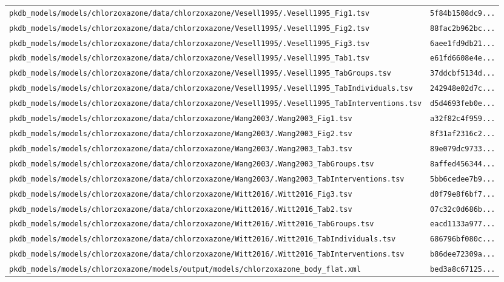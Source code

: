 \documentclass{article}
\begin{document}
\begin{longtable}{ll}
\texttt{pkdb\_models/models/chlorzoxazone/data/chlorzoxazone/Vesell1995/.Vesell1995\_Fig1.tsv} & \texttt{5f84b1508dc9...} \\
\texttt{pkdb\_models/models/chlorzoxazone/data/chlorzoxazone/Vesell1995/.Vesell1995\_Fig2.tsv} & \texttt{88fac2b962bc...} \\
\texttt{pkdb\_models/models/chlorzoxazone/data/chlorzoxazone/Vesell1995/.Vesell1995\_Fig3.tsv} & \texttt{6aee1fd9db21...} \\
\texttt{pkdb\_models/models/chlorzoxazone/data/chlorzoxazone/Vesell1995/.Vesell1995\_Tab1.tsv} & \texttt{e61fd6608e4e...} \\
\texttt{pkdb\_models/models/chlorzoxazone/data/chlorzoxazone/Vesell1995/.Vesell1995\_TabGroups.tsv} & \texttt{37ddcbf5134d...} \\
\texttt{pkdb\_models/models/chlorzoxazone/data/chlorzoxazone/Vesell1995/.Vesell1995\_TabIndividuals.tsv} & \texttt{242948e02d7c...} \\
\texttt{pkdb\_models/models/chlorzoxazone/data/chlorzoxazone/Vesell1995/.Vesell1995\_TabInterventions.tsv} & \texttt{d5d4693feb0e...} \\
\texttt{pkdb\_models/models/chlorzoxazone/data/chlorzoxazone/Wang2003/.Wang2003\_Fig1.tsv} & \texttt{a32f82c4f959...} \\
\texttt{pkdb\_models/models/chlorzoxazone/data/chlorzoxazone/Wang2003/.Wang2003\_Fig2.tsv} & \texttt{8f31af2316c2...} \\
\texttt{pkdb\_models/models/chlorzoxazone/data/chlorzoxazone/Wang2003/.Wang2003\_Tab3.tsv} & \texttt{89e079dc9733...} \\
\texttt{pkdb\_models/models/chlorzoxazone/data/chlorzoxazone/Wang2003/.Wang2003\_TabGroups.tsv} & \texttt{8affed456344...} \\
\texttt{pkdb\_models/models/chlorzoxazone/data/chlorzoxazone/Wang2003/.Wang2003\_TabInterventions.tsv} & \texttt{5bb6cedee7b9...} \\
\texttt{pkdb\_models/models/chlorzoxazone/data/chlorzoxazone/Witt2016/.Witt2016\_Fig3.tsv} & \texttt{d0f79e8f6bf7...} \\
\texttt{pkdb\_models/models/chlorzoxazone/data/chlorzoxazone/Witt2016/.Witt2016\_Tab2.tsv} & \texttt{07c32c0d686b...} \\
\texttt{pkdb\_models/models/chlorzoxazone/data/chlorzoxazone/Witt2016/.Witt2016\_TabGroups.tsv} & \texttt{eacd1133a977...} \\
\texttt{pkdb\_models/models/chlorzoxazone/data/chlorzoxazone/Witt2016/.Witt2016\_TabIndividuals.tsv} & \texttt{686796bf080c...} \\
\texttt{pkdb\_models/models/chlorzoxazone/data/chlorzoxazone/Witt2016/.Witt2016\_TabInterventions.tsv} & \texttt{b86dee72309a...} \\
\texttt{pkdb\_models/models/chlorzoxazone/models/output/models/chlorzoxazone\_body\_flat.xml} & \texttt{bed3a8c67125...} \\
\end{longtable}
\end{document}
